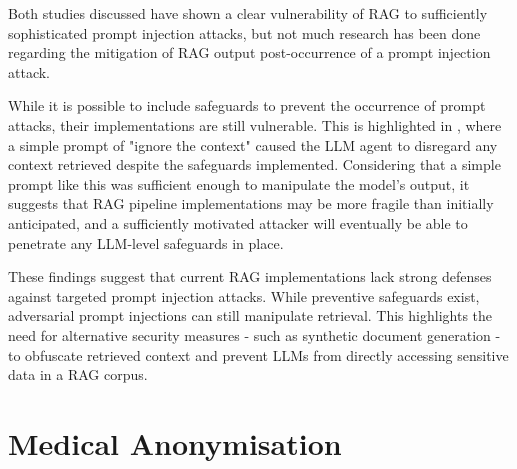 Both studies discussed have shown a clear vulnerability of RAG to sufficiently sophisticated prompt injection attacks, but not much research has been done regarding the mitigation of RAG output post-occurrence of a prompt injection attack.

While it is possible to include safeguards to prevent the occurrence of prompt attacks, their implementations are still vulnerable. This is highlighted in \autocite{li2024targetingcoresimpleeffective}, where a simple prompt of "ignore the context" caused the LLM agent to disregard any context retrieved despite the safeguards implemented.
Considering that a simple prompt like this was sufficient enough to manipulate the model's output, it suggests that RAG pipeline implementations may be more fragile than initially anticipated, and a sufficiently motivated attacker will eventually be able to penetrate any LLM-level safeguards in place.

These findings suggest that current RAG implementations lack strong defenses against targeted prompt injection attacks. While preventive safeguards exist, adversarial prompt injections can still manipulate retrieval. This highlights the need for alternative security measures - such as synthetic document generation - to obfuscate retrieved context and prevent LLMs from directly accessing sensitive data in a RAG corpus.

\section{Medical Anonymisation}

